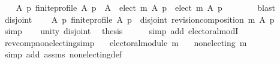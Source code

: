 \begin{isabellebody}
\ \ \isamarkupfalse%
\ {\isachardoublequoteopen}{\isasymforall}A\ p{\isachardot}{\kern0pt}\ finite{\isacharunderscore}{\kern0pt}profile\ A\ p\ {\isasymlongrightarrow}\ {\isacharparenleft}{\kern0pt}A\ {\isacharminus}{\kern0pt}\ elect\ m\ A\ p{\isacharparenright}{\kern0pt}\ {\isasyminter}\ elect\ m\ A\ p\ {\isacharequal}{\kern0pt}\ {\isacharbraceleft}{\kern0pt}{\isacharbraceright}{\kern0pt}{\isachardoublequoteclose}\isanewline
\ \ \ \ \isamarkupfalse%
\ blast\isanewline
\ \ \isamarkupfalse%
\ disjoint{\isacharcolon}{\kern0pt}\isanewline
\ \ \ \ {\isachardoublequoteopen}{\isasymforall}A\ p{\isachardot}{\kern0pt}\ finite{\isacharunderscore}{\kern0pt}profile\ A\ p\ {\isasymlongrightarrow}\ disjoint{}\ {\isacharparenleft}{\kern0pt}revision{\isacharunderscore}{\kern0pt}composition\ m\ A\ p{\isacharparenright}{\kern0pt}{\isachardoublequoteclose}\isanewline
\ \ \ \ \isamarkupfalse%
\ simp\isanewline
\ \ \isamarkupfalse%
\ unity\ disjoint\ \isamarkupfalse%
\ {\isacharquery}{\kern0pt}thesis\isanewline
\ \ \ \ \isamarkupfalse%
\ {\isacharparenleft}{\kern0pt}simp\ add{\isacharcolon}{\kern0pt}\ electoral{\isacharunderscore}{\kern0pt}modI{\isacharparenright}{\kern0pt}\isanewline
{}\isamarkupfalse%
%
\endisatagproof
{\isafoldproof}%
%
\isadelimproof
%
\endisadelimproof
%
\isadelimdocument
%
\endisadelimdocument
%
\isatagdocument
%
\isamarkuptrue%
%
\endisatagdocument
{\isafolddocument}%
%
\isadelimdocument
%
\endisadelimdocument
{}\isamarkupfalse%
\ rev{\isacharunderscore}{\kern0pt}comp{\isacharunderscore}{\kern0pt}non{\isacharunderscore}{\kern0pt}electing{\isacharbrackleft}{\kern0pt}simp{\isacharbrackright}{\kern0pt}{\isacharcolon}{\kern0pt}\isanewline
\ \ \ {\isachardoublequoteopen}electoral{\isacharunderscore}{\kern0pt}module\ m{\isachardoublequoteclose}\isanewline
\ \ \ {\isachardoublequoteopen}non{\isacharunderscore}{\kern0pt}electing\ {\isacharparenleft}{\kern0pt}m{\isasymdown}{\isacharparenright}{\kern0pt}{\isachardoublequoteclose}\isanewline
%
\isadelimproof
\ \ %
\endisadelimproof
%
\isatagproof
{}\isamarkupfalse%
\ {\isacharparenleft}{\kern0pt}simp\ add{\isacharcolon}{\kern0pt}\ assms\ non{\isacharunderscore}{\kern0pt}electing{\isacharunderscore}{\kern0pt}def{\isacharparenright}{\kern0pt}%
\endisatagproof
{\isafoldproof}%
%
\isadelimproof
\isanewline
%
\endisadelimproof
\isanewline
\isanewline
{}\isamarkupfalse%

\end{isabellebody}
